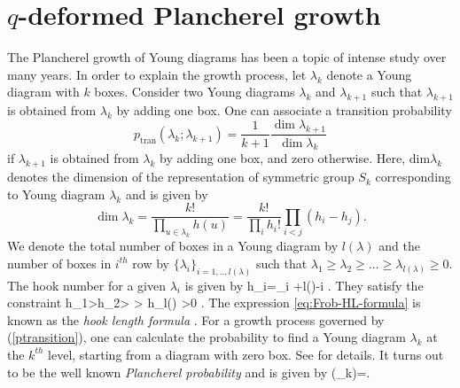 \documentclass[3p,12pt]{elsarticle}
\numberwithin{equation}{section}
\begin{document}
	
	
\section{$q$-deformed Plancherel growth}
\label{sec:qplancherel}

The Plancherel growth of Young diagrams has been a topic of intense study over many years. In order to explain the growth process, let $\lambda_k$ denote a Young diagram with $k$ boxes. Consider two Young diagrams $\lambda_k$ and $\lambda_{k+1}$ such that $\lambda_{k+1}$ is obtained from $\lambda_k$ by adding one box. One can associate a transition probability
\begin{equation}
\label{ptransition}
p_{\text{tran}}(\lambda_k;\lambda_{k+1})=\frac{1}{k+1}\frac{\dim \lambda_{k+1}}{\dim \lambda_k}
\end{equation}
if $\lambda_{k+1}$ is obtained from $\lambda_{k}$ by adding one box, and zero otherwise. Here, $\text{dim}\lambda_k$ denotes the dimension of the representation of symmetric group $S_k$ corresponding to Young diagram $\lambda_k$ and is given by
\begin{equation}
\label{eq:Frob-HL-formula}
\dim \lambda_k= \frac{k!} {\prod_{u\in \lambda_k}h(u)} =  \frac{k!}{\prod_i h_i!} \prod_{i<j}(h_i-h_j) .
\end{equation}
We denote the total number of boxes in a Young diagram by $l(\lambda)$ and the number of boxes in $i^{th}$ row by $\{\lambda_i\}_{i=1,..,l(\lambda)}$ such that $\lambda_1 \geq \lambda_2 \geq ... \geq \lambda_{l{(\lambda)}} \geq 0$. The hook number for a given $\lambda_i$ is given by
%
\ben
h_i=\lambda_i +l(\lambda)-i .
\een
%
They satisfy the constraint
\ben\label{eq:hiconst}
h_1>h_2> \cdots > h_{l(\lambda)} >0 .
\een
The expression \eqref{eq:Frob-HL-formula} is known as the \emph{hook length formula} \cite{fulton1991representation}. For a growth process governed by (\ref{ptransition}), one can calculate the probability to find a Young diagram $\lambda_k$ at the $k^{th}$ level, starting from a diagram with zero box. See \cite{Chattopadhyay:2019pkl} for details. It turns out to be the well known \emph{Plancherel probability} and is given by
\be
\label{pmeasure}
(\lambda_k)=.
\ee
\end{document}
